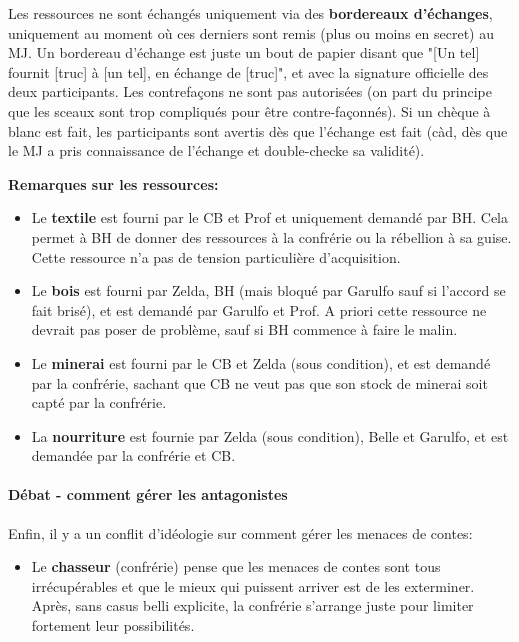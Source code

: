 {	\par Les ressources ne sont échangés uniquement via des \textbf{bordereaux d'échanges}, uniquement au moment où ces derniers sont remis (plus ou moins en secret) au MJ. Un bordereau d'échange est juste un bout de papier disant que "[Un tel] fournit [truc] à [un tel], en échange de [truc]", et avec la signature officielle des deux participants. Les contrefaçons ne sont pas autorisées (on part du principe que les sceaux sont trop compliqués pour être contre-façonnés). Si un chèque à blanc est fait, les participants sont avertis dès que l'échange est fait (càd, dès que le MJ a pris connaissance de l'échange et double-checke sa validité).
	
	\par \textbf{Remarques sur les ressources:}
	\begin{itemize}
		\item Le \textbf{textile} est fourni par le CB et Prof et uniquement demandé par BH. Cela permet à BH de donner des ressources à la confrérie ou la rébellion à sa guise. Cette ressource n'a pas de tension particulière d'acquisition.
		\item Le \textbf{bois} est fourni par Zelda, BH (mais bloqué par Garulfo sauf si l'accord se fait brisé), et est demandé par Garulfo et Prof. A priori cette ressource ne devrait pas poser de problème, sauf si BH commence à faire le malin.
		\item Le \textbf{minerai} est fourni par le CB et Zelda (sous condition), et est demandé par la confrérie, sachant que CB ne veut pas que son stock de minerai soit capté par la confrérie.
		\item La \textbf{nourriture} est fournie par Zelda (sous condition), Belle et Garulfo, et est demandée par la confrérie et CB.
	\end{itemize}
	
	
	
	\paragraph{Débat - comment gérer les antagonistes} Enfin, il y a un conflit d'idéologie sur comment gérer les menaces de contes:
	\begin{itemize}
		\item Le \textbf{chasseur} (confrérie) pense que les menaces de contes sont tous irrécupérables et que le mieux qui puissent arriver est de les exterminer. Après, sans casus belli explicite, la confrérie s'arrange juste pour limiter fortement leur possibilités.
		

\end{itemize}}
